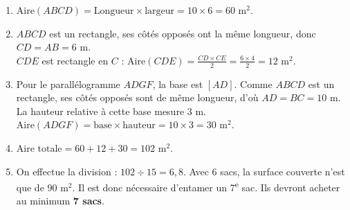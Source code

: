 \documentclass[a4paper]{book}
\begin{document}
{\begin{exercice}
\begin{center}
        \end{center}
    \end{exercice}
    
    \begin{exercice}
        \begin{enumerate}
            \item $\text{Aire}(ABCD) = \text{Longueur} \times \text{largeur} = 10 \times 6 = 60 \text{ m}^2$.
            \item $ABCD$ est un rectangle, ses côtés opposés ont la même longueur, donc $CD = AB = 6 \text{ m}$. \\
            $CDE$ est rectangle en $C$ : $\text{Aire}(CDE) = \frac{CD \times CE}{2} = \frac{6 \times 4}{2} = 12 \text{ m}^2$.
            \item Pour le parallélogramme $ADGF$, la base est $[AD]$. Comme $ABCD$ est un rectangle, ses côtés opposés sont de même longueur, d'où $AD = BC = 10 \text{ m}$. La hauteur relative à cette base mesure $3 \text{ m}$. \\
            $\text{Aire}(ADGF) = \text{base} \times \text{hauteur} = 10 \times 3 = 30 \text{ m}^2$.
            \item $\text{Aire totale} = 60 + 12 + 30 = 102 \text{ m}^2$.
            \item On effectue la division : $102 \div 15 = 6,8$. Avec 6 sacs, la surface couverte n'est que de $90 \text{ m}^2$. Il est donc nécessaire d'entamer un 7\textsuperscript{e} sac. Ils devront acheter au minimum \textbf{7 sacs}.
        \end{enumerate}
    \end{exercice}
}
\end{document}
